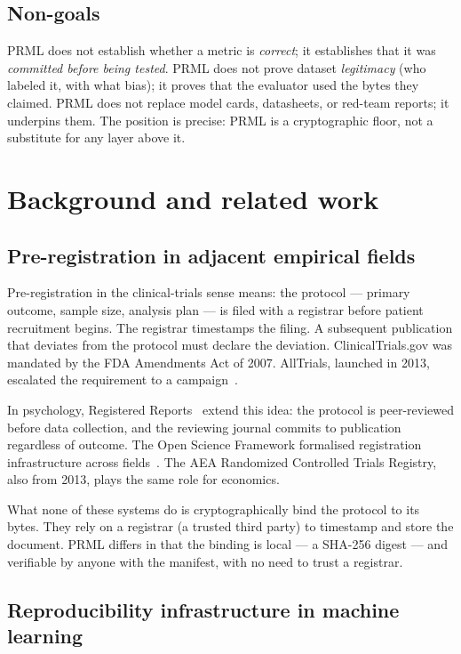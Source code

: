 \documentclass[11pt, a4paper]{article}
\begin{document}
\subsection{Non-goals}

PRML does not establish whether a metric is \emph{correct}; it establishes that it was \emph{committed before being tested}. PRML does not prove dataset \emph{legitimacy} (who labeled it, with what bias); it proves that the evaluator used the bytes they claimed. PRML does not replace model cards, datasheets, or red-team reports; it underpins them. The position is precise: PRML is a cryptographic floor, not a substitute for any layer above it.

\section{Background and related work}
\label{sec:related}

\subsection{Pre-registration in adjacent empirical fields}

Pre-registration in the clinical-trials sense means: the protocol --- primary outcome, sample size, analysis plan --- is filed with a registrar before patient recruitment begins. The registrar timestamps the filing. A subsequent publication that deviates from the protocol must declare the deviation. ClinicalTrials.gov was mandated by the FDA Amendments Act of 2007. AllTrials, launched in 2013, escalated the requirement to a campaign~\cite{goldacre2014alltrials}.

In psychology, Registered Reports~\cite{chambers2013registered} extend this idea: the protocol is peer-reviewed before data collection, and the reviewing journal commits to publication regardless of outcome. The Open Science Framework formalised registration infrastructure across fields~\cite{nosek2018preregistration}. The AEA Randomized Controlled Trials Registry, also from 2013, plays the same role for economics.

What none of these systems do is cryptographically bind the protocol to its bytes. They rely on a registrar (a trusted third party) to timestamp and store the document. PRML differs in that the binding is local --- a SHA-256 digest --- and verifiable by anyone with the manifest, with no need to trust a registrar.

\subsection{Reproducibility infrastructure in machine learning}
\end{document}
